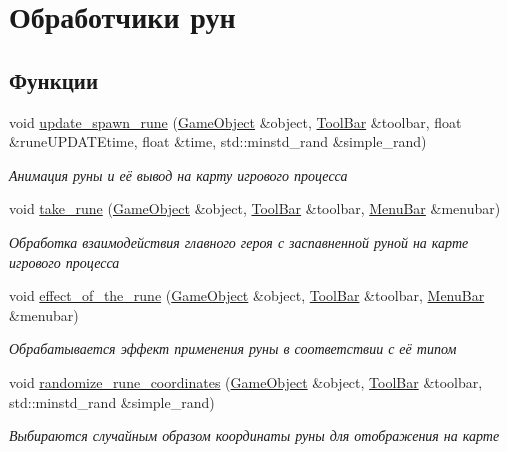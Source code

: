 \hypertarget{group__runeHandler}{}\section{Обработчики рун}
\label{group__runeHandler}
\subsection*{Функции}
\begin{DoxyCompactItemize}
\item 
void \hyperlink{group__runeHandler_ga813bbb2330c07f4bf303406c4efab35d}{update\+\_\+spawn\+\_\+rune} (\hyperlink{classGameObject}{Game\+Object} \&object, \hyperlink{classToolBar}{Tool\+Bar} \&toolbar, float \&rune\+U\+P\+D\+A\+T\+Etime, float \&time, std\+::minstd\+\_\+rand \&simple\+\_\+rand)
\begin{DoxyCompactList}\small\item\em Анимация руны и её вывод на карту игрового процесса \end{DoxyCompactList}\item 
void \hyperlink{group__runeHandler_gaf2bb7b78f028e61a0c6674cd9b976a8c}{take\+\_\+rune} (\hyperlink{classGameObject}{Game\+Object} \&object, \hyperlink{classToolBar}{Tool\+Bar} \&toolbar, \hyperlink{classMenuBar}{Menu\+Bar} \&menubar)
\begin{DoxyCompactList}\small\item\em Обработка взаимодействия главного героя с заспавненной руной на карте игрового процесса \end{DoxyCompactList}\item 
void \hyperlink{group__runeHandler_ga0078b36ac662e224e1913996193c1c98}{effect\+\_\+of\+\_\+the\+\_\+rune} (\hyperlink{classGameObject}{Game\+Object} \&object, \hyperlink{classToolBar}{Tool\+Bar} \&toolbar, \hyperlink{classMenuBar}{Menu\+Bar} \&menubar)
\begin{DoxyCompactList}\small\item\em Обрабатывается эффект применения руны в соответствии с её типом \end{DoxyCompactList}\item 
void \hyperlink{group__runeHandler_gad3bb6254181bfa4913a3ec9a0f206f69}{randomize\+\_\+rune\+\_\+coordinates} (\hyperlink{classGameObject}{Game\+Object} \&object, \hyperlink{classToolBar}{Tool\+Bar} \&toolbar, std\+::minstd\+\_\+rand \&simple\+\_\+rand)
\begin{DoxyCompactList}\small\item\em Выбираются случайным образом координаты руны для отображения на карте \end{DoxyCompactList}\end{DoxyCompactItemize}


